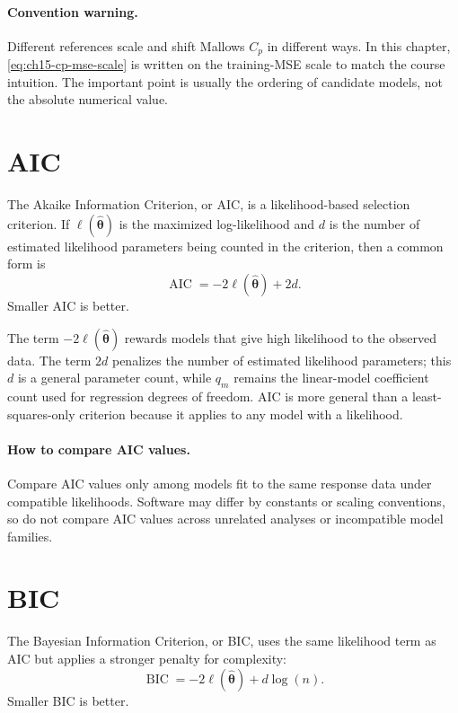 \paragraph{Convention warning.}
Different references scale and shift Mallows \(C_p\) in different ways.  In this chapter, \eqref{eq:ch15-cp-mse-scale} is written on the training-MSE scale to match the course intuition.  The important point is usually the ordering of candidate models, not the absolute numerical value.

\section{AIC}

The Akaike Information Criterion, or AIC, is a likelihood-based selection criterion.  If \(\ell(\widehat{\boldsymbol{\theta}})\) is the maximized log-likelihood and \(d\) is the number of estimated likelihood parameters being counted in the criterion, then a common form is
\begin{equation}
  \boxed{
  \operatorname{AIC}=-2\ell(\widehat{\boldsymbol{\theta}})+2d.
  }
  \label{eq:ch15-aic}
\end{equation}
Smaller AIC is better.

The term \(-2\ell(\widehat{\boldsymbol{\theta}})\) rewards models that give high likelihood to the observed data.  The term \(2d\) penalizes the number of estimated likelihood parameters; this \(d\) is a general parameter count, while \(q_m\) remains the linear-model coefficient count used for regression degrees of freedom.  AIC is more general than a least-squares-only criterion because it applies to any model with a likelihood.

\paragraph{How to compare AIC values.}
Compare AIC values only among models fit to the same response data under compatible likelihoods.  Software may differ by constants or scaling conventions, so do not compare AIC values across unrelated analyses or incompatible model families.

\section{BIC}

The Bayesian Information Criterion, or BIC, uses the same likelihood term as AIC but applies a stronger penalty for complexity:
\begin{equation}
  \boxed{
  \operatorname{BIC}=-2\ell(\widehat{\boldsymbol{\theta}})+d\log(n).
  }
  \label{eq:ch15-bic}
\end{equation}
Smaller BIC is better.

